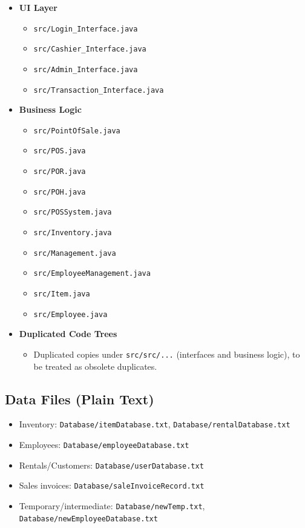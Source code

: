 \begin{itemize}[leftmargin=1.2cm]
  \item \textbf{UI Layer}
  \begin{itemize}
    \item \texttt{src/Login\_Interface.java}
    \item \texttt{src/Cashier\_Interface.java}
    \item \texttt{src/Admin\_Interface.java}
    \item \texttt{src/Transaction\_Interface.java}
  \end{itemize}
  \item \textbf{Business Logic}
  \begin{itemize}
    \item \texttt{src/PointOfSale.java}
    \item \texttt{src/POS.java}
    \item \texttt{src/POR.java}
    \item \texttt{src/POH.java}
    \item \texttt{src/POSSystem.java}
    \item \texttt{src/Inventory.java}
    \item \texttt{src/Management.java}
    \item \texttt{src/EmployeeManagement.java}
    \item \texttt{src/Item.java}
    \item \texttt{src/Employee.java}
  \end{itemize}
  \item \textbf{Duplicated Code Trees}
  \begin{itemize}
    \item Duplicated copies under \texttt{src/src/...} (interfaces and
          business logic), to be treated as obsolete duplicates.
  \end{itemize}
\end{itemize}

\subsection*{Data Files (Plain Text)}

\begin{itemize}[leftmargin=1.2cm]
  \item Inventory:
        \texttt{Database/itemDatabase.txt},
        \texttt{Database/rentalDatabase.txt}
  \item Employees:
        \texttt{Database/employeeDatabase.txt}
  \item Rentals/Customers:
        \texttt{Database/userDatabase.txt}
  \item Sales invoices:
        \texttt{Database/saleInvoiceRecord.txt}
  \item Temporary/intermediate:
        \texttt{Database/newTemp.txt},
        \texttt{Database/newEmployeeDatabase.txt}
\end{itemize}

